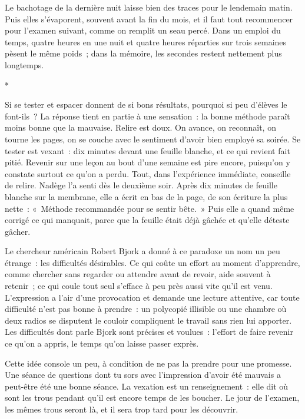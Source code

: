 \documentclass[10.5pt,twoside,openright]{book}
\newcommand{\asterisme}{\par\vspace{0.7em}\centerline{\color{gris}*\quad*\quad*}\vspace{0.7em}\par\noindent}
\begin{document}
Le bachotage de la dernière nuit laisse bien des traces pour le lendemain matin. Puis elles s’évaporent, souvent avant la fin du mois, et il faut tout recommencer pour l’examen suivant, comme on remplit un seau percé. Dans un emploi du temps, quatre heures en une nuit et quatre heures réparties sur trois semaines pèsent le même poids ; dans la mémoire, les secondes restent nettement plus longtemps.

\asterisme

Si se tester et espacer donnent de si bons résultats, pourquoi si peu d’élèves le font-ils ? La réponse tient en partie à une sensation : la bonne méthode paraît moins bonne que la mauvaise. Relire est doux. On avance, on reconnaît, on tourne les pages, on se couche avec le sentiment d’avoir bien employé sa soirée. Se tester est vexant : dix minutes devant une feuille blanche, et ce qui revient fait pitié. Revenir sur une leçon au bout d’une semaine est pire encore, puisqu’on y constate surtout ce qu’on a perdu. Tout, dans l’expérience immédiate, conseille de relire. Nadège l’a senti dès le deuxième soir. Après dix minutes de feuille blanche sur la membrane, elle a écrit en bas de la page, de son écriture la plus nette : « Méthode recommandée pour se sentir bête. » Puis elle a quand même corrigé ce qui manquait, parce que la feuille était déjà gâchée et qu’elle déteste gâcher.

Le chercheur américain Robert Bjork a donné à ce paradoxe un nom un peu étrange : les difficultés désirables. Ce qui coûte un effort au moment d’apprendre, comme chercher sans regarder ou attendre avant de revoir, aide souvent à retenir ; ce qui coule tout seul s’efface à peu près aussi vite qu’il est venu. L’expression a l’air d’une provocation et demande une lecture attentive, car toute difficulté n’est pas bonne à prendre : un polycopié illisible ou une chambre où deux radios se disputent le couloir compliquent le travail sans rien lui apporter. Les difficultés dont parle Bjork sont précises et voulues : l’effort de faire revenir ce qu’on a appris, le temps qu’on laisse passer exprès.

Cette idée console un peu, à condition de ne pas la prendre pour une promesse. Une séance de questions dont tu sors avec l’impression d’avoir été mauvais a peut-être été une bonne séance. La vexation est un renseignement : elle dit où sont les trous pendant qu’il est encore temps de les boucher. Le jour de l’examen, les mêmes trous seront là, et il sera trop tard pour les découvrir.
\end{document}
